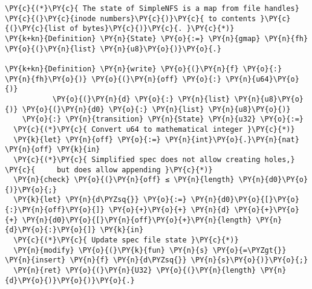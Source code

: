 \begin{Verbatim}[commandchars=\\\{\},codes={\catcode`\$=3\catcode`\^=7\catcode`\_=8},fontsize=\small]
\PY{c}{(*}\PY{c}{ The state of SimpleNFS is a map from file handles}
\PY{c}{(}\PY{c}{inode numbers}\PY{c}{)}\PY{c}{ to contents }\PY{c}{(}\PY{c}{list of bytes}\PY{c}{)}\PY{c}{. }\PY{c}{*)}
\PY{k+kn}{Definition} \PY{n}{State} \PY{o}{:=} \PY{n}{gmap} \PY{n}{fh} \PY{o}{(}\PY{n}{list} \PY{n}{u8}\PY{o}{)}\PY{o}{.}

\PY{k+kn}{Definition} \PY{n}{write} \PY{o}{(}\PY{n}{f} \PY{o}{:} \PY{n}{fh}\PY{o}{)} \PY{o}{(}\PY{n}{off} \PY{o}{:} \PY{n}{u64}\PY{o}{)}
           \PY{o}{(}\PY{n}{d} \PY{o}{:} \PY{n}{list} \PY{n}{u8}\PY{o}{)} \PY{o}{(}\PY{n}{d0} \PY{o}{:} \PY{n}{list} \PY{n}{u8}\PY{o}{)}
    \PY{o}{:} \PY{n}{transition} \PY{n}{State} \PY{n}{u32} \PY{o}{:=}
  \PY{c}{(*}\PY{c}{ Convert u64 to mathematical integer }\PY{c}{*)}
  \PY{k}{let} \PY{n}{off} \PY{o}{:=} \PY{n}{int}\PY{o}{.}\PY{n}{nat} \PY{n}{off} \PY{k}{in}
  \PY{c}{(*}\PY{c}{ Simplified spec does not allow creating holes,}
\PY{c}{     but does allow appending }\PY{c}{*)}
  \PY{n}{check} \PY{o}{(}\PY{n}{off} ≤ \PY{n}{length} \PY{n}{d0}\PY{o}{)}\PY{o}{;}
  \PY{k}{let} \PY{n}{d\PYZsq{}} \PY{o}{:=} \PY{n}{d0}\PY{o}{[}\PY{o}{:}\PY{n}{off}\PY{o}{]} \PY{o}{+}\PY{o}{+} \PY{n}{d} \PY{o}{+}\PY{o}{+} \PY{n}{d0}\PY{o}{[}\PY{n}{off}\PY{o}{+}\PY{n}{length} \PY{n}{d}\PY{o}{:}\PY{o}{]} \PY{k}{in}
  \PY{c}{(*}\PY{c}{ Update spec file state }\PY{c}{*)}
  \PY{n}{modify} \PY{o}{(}\PY{k}{fun} \PY{n}{s} \PY{o}{=\PYZgt{}} \PY{n}{insert} \PY{n}{f} \PY{n}{d\PYZsq{}} \PY{n}{s}\PY{o}{)}\PY{o}{;}
  \PY{n}{ret} \PY{o}{(}\PY{n}{U32} \PY{o}{(}\PY{n}{length} \PY{n}{d}\PY{o}{)}\PY{o}{)}\PY{o}{.}
\end{Verbatim}
